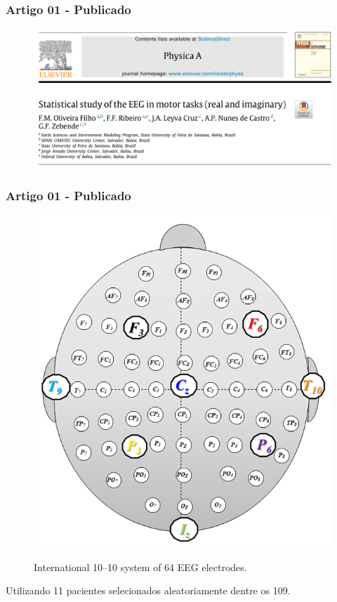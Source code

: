 \documentclass[11pt, aspectratio=169]{beamer}
\begin{document}
\begin{frame}
  \frametitle{Artigo 01 - Publicado}
  \begin{figure}[!htb]    \centering
    \caption{\cite{Oliveira2023}}
    \includegraphics[height=.6\paperheight]{../Figures/artigos_publicados/artigo_01_abr_2023.png}
    \label{fig:ar_pub_01}
  \end{figure}
\end{frame}

\begin{frame}
  \frametitle{Artigo 01 - Publicado}
  \begin{figure}[!htb]
    \centering
    \caption{International 10–10 system of 64 EEG electrodes.}
    \includegraphics[height=.6\paperheight]{../Figures/artigo_anexo/canais_cabeca.png}
    \label{fig:ar_canais_cabeça}
  \end{figure}
  Utilizando 11 pacientes selecionados aleatoriamente dentre os 109.
\end{frame}
\end{document}
